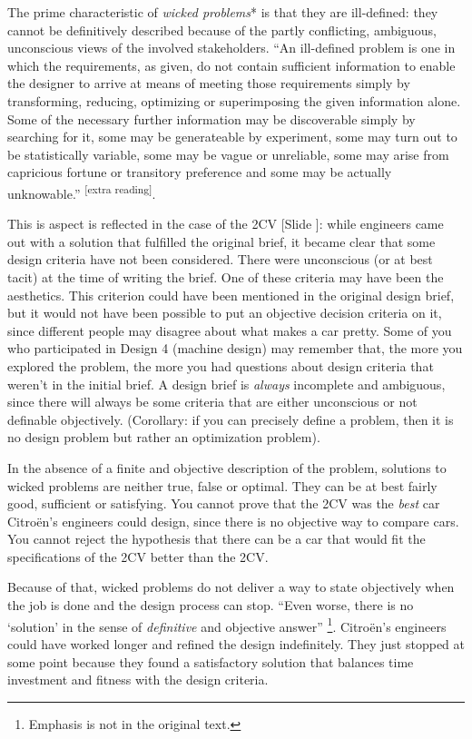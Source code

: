 \documentclass{article}
\newcounter{slide}
\begin{document}
The prime characteristic of \emph{wicked problems}* is that they are ill-defined: they cannot be definitively described because of the partly conflicting, ambiguous, unconscious views of the involved stakeholders. ``An ill-defined problem is one in which the requirements, as given, do not contain sufficient information to enable the designer to arrive at means of meeting those requirements simply by transforming, reducing, optimizing or superimposing the given information alone. Some of the necessary further information may be discoverable simply by searching for it, some may be generateable by experiment, some may turn out to be statistically variable, some may be vague or unreliable, some may arise from capricious fortune or transitory preference and some may be actually unknowable.'' \cite{archerDesignDiscipline1979}\textsuperscript{\color{Magenta}[extra reading]}. 

This is aspect is reflected in the case of the 2CV {\color{blue}[Slide ]}: while engineers came out with a solution that fulfilled the original brief, it became clear that some design criteria have not been considered. There were unconscious (or at best tacit) at the time of writing the brief. One of these criteria may have been the aesthetics. This criterion could have been mentioned in the original design brief, but it would not have been possible to put an objective decision criteria on it, since different people may disagree about what makes a car pretty. Some of you who participated in Design 4 (machine design) may remember that, the more you explored the problem, the more you had questions about design criteria that weren't in the initial brief. A design brief is \emph{always} incomplete and ambiguous, since there will always be some criteria that are either unconscious or not definable objectively. (Corollary: if you can precisely define a problem, then it is no design problem but rather an optimization problem). 

In the absence of a finite and objective description of the problem, solutions to wicked problems are neither true, false or optimal. They can be at best fairly good, sufficient or satisfying. You cannot prove that the 2CV was the \emph{best} car Citroën's engineers could design, since there is no objective way to compare cars. You cannot reject the hypothesis that there can be a car that would fit the specifications of the 2CV better than the 2CV. 

Because of that, wicked problems do not deliver a way to state objectively when the job is done and the design process can stop. ``Even worse, there is no `solution' in the sense of \emph{definitive} and objective answer'' \cite{rittelDilemmasGeneralTheory1973}\footnote{Emphasis is not in the original text.}. Citroën's engineers could have worked longer and refined the design indefinitely. They just stopped at some point because they found a satisfactory solution that balances time investment and fitness with the design criteria.
\end{document}
